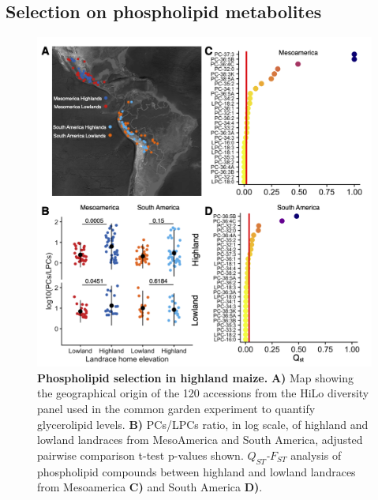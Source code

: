 \documentclass[9pt,twocolumn,twoside,lineno]{BioRxiv}
\begin{document}
\subsection{Selection on phospholipid metabolites}
\begin{figure}[hbp]
\begin{center}
\includegraphics[width=0.4\paperwidth]{Figures/Fig_1.png}
\caption{\textbf{Phospholipid selection in highland maize.} 
\textbf{A)} Map showing the geographical origin of the 120 accessions from the HiLo diversity panel used in the common garden experiment to quantify glycerolipid levels.
\textbf{B)} PCs/LPCs ratio, in log scale, of highland and lowland landraces from MesoAmerica and South America, adjusted pairwise comparison t-test p-values shown.
\textit{$Q_{ST}$-$F_{ST}$} analysis of phospholipid compounds between highland and lowland landraces from Mesoamerica \textbf{C)} and South America \textbf{D)}.
} 
\label{Fig1}
\end{center}
\end{figure}
\end{document}
